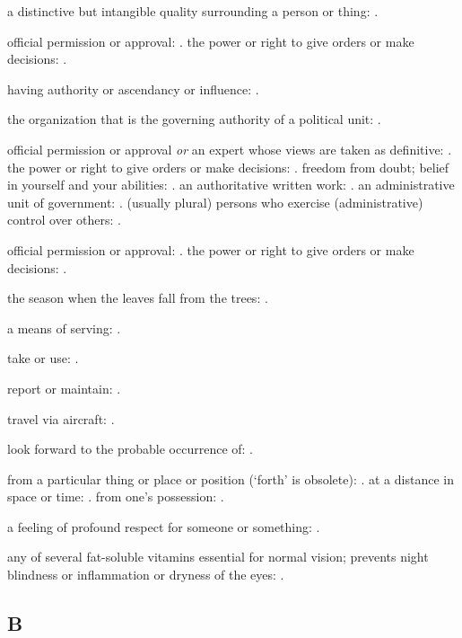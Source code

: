   a distinctive but intangible quality surrounding a person or thing: .

  official permission or approval: . the power or right to give orders or make decisions: .

  having authority or ascendancy or influence: .

  the organization that is the governing authority of a political unit: .

  official permission or approval \textit{or} an expert whose views are taken as definitive: . the power or right to give orders or make decisions: . freedom from doubt; belief in yourself and your abilities: . an authoritative written work: . an administrative unit of government: . (usually plural) persons who exercise (administrative) control over others: .

  official permission or approval: . the power or right to give orders or make decisions: .

  the season when the leaves fall from the trees: .

  a means of serving: .

  take or use: .

  report or maintain: .

  travel via aircraft: .

  look forward to the probable occurrence of: .

  from a particular thing or place or position (`forth' is obsolete): . at a distance in space or time: . from one's possession: .

  a feeling of profound respect for someone or something: .

  any of several fat-soluble vitamins essential for normal vision; prevents night blindness or inflammation or dryness of the eyes: .

\subsection*{B}

